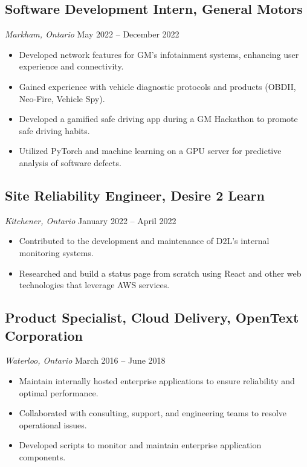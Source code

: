 \documentclass[a4paper,11pt]{article}  %
\begin{document}
\subsection*{Software Development Intern, General Motors}
\textit{Markham, Ontario} \hfill May 2022 -- December 2022
\begin{itemize}
    \item Developed network features for GM’s infotainment systems, enhancing user experience and connectivity.
    \item Gained experience with vehicle diagnostic protocols and products (OBDII, Neo-Fire, Vehicle Spy).
    \item Developed a gamified safe driving app during a GM Hackathon to promote safe driving habits.
    \item Utilized PyTorch and machine learning on a GPU server for predictive analysis of software defects.
\end{itemize}

\subsection*{Site Reliability Engineer, Desire 2 Learn}
\textit{Kitchener, Ontario} \hfill January 2022 -- April 2022
\begin{itemize}
    \item Contributed to the development and maintenance of D2L’s internal monitoring systems.
    \item Researched and build a status page from scratch using React and other web technologies that leverage AWS services.
\end{itemize}

\subsection*{Product Specialist, Cloud Delivery, OpenText Corporation}
\textit{Waterloo, Ontario} \hfill March 2016 -- June 2018
\begin{itemize}
    \item Maintain internally hosted enterprise applications to ensure reliability and optimal performance.
    \item Collaborated with consulting, support, and engineering teams to resolve operational issues.
    \item Developed scripts to monitor and maintain enterprise application components.
\end{itemize}
\end{document}
